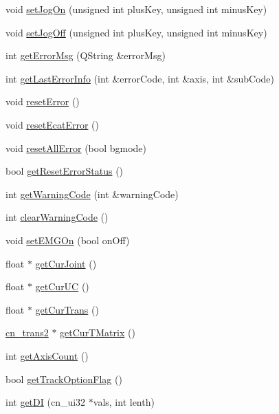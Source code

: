 \begin{DoxyCompactItemize}
\item 
void \hyperlink{classCNRobo_a3c37098a6d0a2e038bcb260ba2e692ea}{set\-Jog\-On} (unsigned int plus\-Key, unsigned int minus\-Key)
\item 
void \hyperlink{classCNRobo_ae7d5974b3af49c4e0ed0617cc189da1e}{set\-Jog\-Off} (unsigned int plus\-Key, unsigned int minus\-Key)
\item 
int \hyperlink{classCNRobo_a443a8c134e0d2fa6078eeeb0a8471213}{get\-Error\-Msg} (Q\-String \&error\-Msg)
\item 
int \hyperlink{classCNRobo_af01cffb4bd9d128e65d480aff274a181}{get\-Last\-Error\-Info} (int \&error\-Code, int \&axis, int \&sub\-Code)
\item 
void \hyperlink{classCNRobo_adaa150a70dd4d216e8d5f5cf00936fe9}{reset\-Error} ()
\item 
void \hyperlink{classCNRobo_a0f8860085db594d795312cb6fbfe1343}{reset\-Ecat\-Error} ()
\item 
void \hyperlink{classCNRobo_a87551c44ca74506528b77f30426a6fe0}{reset\-All\-Error} (bool bgmode)
\item 
bool \hyperlink{classCNRobo_a642822fcfe41c5799914a3014f47daee}{get\-Reset\-Error\-Status} ()
\item 
int \hyperlink{classCNRobo_a26db9d716e43576ff01ce0e2551dfd39}{get\-Warning\-Code} (int \&warning\-Code)
\item 
int \hyperlink{classCNRobo_a4da3801dfbc69be116ca7063f029e0eb}{clear\-Warning\-Code} ()
\item 
void \hyperlink{classCNRobo_aa4e6b36a14604d769252421d758815f7}{set\-E\-M\-G\-On} (bool on\-Off)
\item 
float $\ast$ \hyperlink{classCNRobo_aa8385391caae99f9805c86cac2465627}{get\-Cur\-Joint} ()
\item 
float $\ast$ \hyperlink{classCNRobo_a088493db533b44cce4213dfc98ea91ea}{get\-Cur\-U\-C} ()
\item 
float $\ast$ \hyperlink{classCNRobo_a9a59e27a3a0519407245396930316a68}{get\-Cur\-Trans} ()
\item 
\hyperlink{structcn__trans2}{cn\-\_\-trans2} $\ast$ \hyperlink{classCNRobo_a2dd17c40f601608665408aa9dcbdf044}{get\-Cur\-T\-Matrix} ()
\item 
int \hyperlink{classCNRobo_a9f13cb584f494b15cfbccb58e8309d99}{get\-Axis\-Count} ()
\item 
bool \hyperlink{classCNRobo_ab058d9766b3f74157c17b4d598c49d40}{get\-Track\-Option\-Flag} ()
\item 
int \hyperlink{classCNRobo_ac64c0852759ee335dbebe882ae927a72}{get\-D\-I} (cn\-\_\-ui32 $\ast$vals, int lenth)

\end{DoxyCompactItemize}
